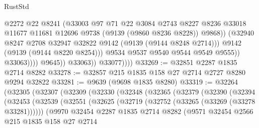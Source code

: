 \begin{lexlean}{RustStd}
\begin{coremodule}
                                    @2272
                                    @22
                                    @8241
                                    (@33003
                                      @97
                                      @71
                                      @22
                                      @3084
                                      @2743
                                      @8227
                                      @8236
                                      @33018
                                      @11677
                                      @11681
                                      @12696
                                      @9738
                                      (@9139 (@9860 @8236 @8228))
                                      @9868))
                                  (@32940
                                    @8247
                                    @2708
                                    @32947
                                    @32822
                                    @9142
                                    (@9139 (@9144 @8248 @2714)))
                                  @9142
                                  (@9139 (@9144 @8220 @8254)))
                                @9534
                                @9537
                                @9540
                                @9544
                                @9549
                                @9555))
                            @33063))))
                    @9645))
                @33063))
            @33077))))
@33269 := @32851 @2287 @1835 @2714 @8282
@33278 := @32857 @215 @1835 @158 @27 @2714 @2727 @8280 @9294 @32822
@33281 := @9639 (@9698 @1835 @8280)
@33319 := @32264
    (@32305
      (@32307
        (@32309
          (@32330
            (@32348
              (@32365
                (@32379
                  (@32390
                    (@32394
                      (@32453
                        (@32539
                          (@32551
                            (@32625 (@32719 (@32752 (@33265 (@33269 (@33278 @33281))))))
                            (@9970
                              @32454
                              @2287
                              @1835
                              @2714
                              @8282
                              (@9571
                                @32454
                                @2566
                                @215
                                @1835
                                @158
                                @27
                                @2714

\end{coremodule}
\end{lexlean}
